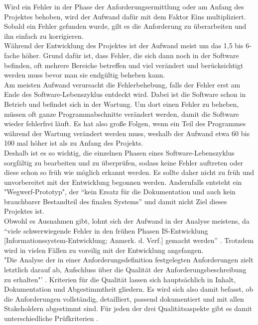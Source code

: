 \documentclass [12pt, a4paper, oneside, titlepage, ngerman]{article}
\begin{document}
\noindent Wird ein Fehler in der Phase der Anforderungsermittlung oder am Anfang des Projektes behoben, wird der Aufwand dafür mit dem Faktor Eins multipliziert. Sobald ein Fehler gefunden wurde, gilt es die Anforderung zu überarbeiten und ihn einfach zu korrigieren.\\
Während der Entwicklung des Projektes ist der Aufwand meist um das 1,5 bis 6-fache höher. Grund dafür ist, dass Fehler, die sich dann noch in der Software befinden, oft mehrere Bereiche betreffen und viel verändert und berücksichtigt werden muss bevor man sie endgültig beheben kann.\\
Am meisten Aufwand verursacht die Fehlerbehebung, falls der Fehler erst am Ende des Software-Lebenszyklus entdeckt wird. Dabei ist die Software schon in Betrieb und befindet sich in der Wartung. Um dort einen Fehler zu beheben, müssen oft ganze Programmabschnitte verändert werden, damit die Software wieder fehlerfrei läuft. Es hat also große Folgen, wenn ein Teil des Programmes während der Wartung verändert werden muss, weshalb der Aufwand etwa 60 bis 100 mal höher ist als zu Anfang des Projekts. \\
Deshalb ist es so wichtig, die einzelnen Phasen eines Software-Lebenszyklus sorgfältig zu bearbeiten und zu überprüfen, sodass keine Fehler auftreten oder diese schon so früh wie möglich erkannt werden. Es sollte daher nicht zu früh und unvorbereitet mit der Entwicklung begonnen werden. Andernfalls entsteht ein "Wegwerf-Prototyp", der "`kein Ersatz für die Dokumentation und auch kein brauchbarer Bestandteil des finalen Systems"' \cite[]{Kuhrmann2012} und damit nicht Ziel dieses Projektes ist.\\
Obwohl es Ausnahmen gibt, lohnt sich der Aufwand in der Analyse meistens, da "`viele schwerwiegende Fehler in den frühen Phasen IS-Entwicklung [Informationssystem-Entwicklung; Anmerk. d. Verf.] gemacht werden"' \cite[S.316]{Alpar2016}. Trotzdem wird in vielen Fällen zu voreilig mit der Entwicklung angefangen. \\
"Die Analyse der in einer Anforderungsdefinition festgelegten Anforderungen zielt letztlich darauf ab, Aufschluss über die Qualität der Anforderungsbeschreibung zu erhalten"' \cite[S.51]{partsch2010}. Kriterien für die Qualität lassen sich hauptsächlich in Inhalt, Dokumentation und Abgestimmtheit gliedern. Es wird sich also damit befasst, ob die Anforderungen vollständig, detailliert, passend dokumentiert und mit allen Stakeholdern abgestimmt sind. Für jeden der drei Qualitätsaspekte gibt es damit unterschiedliche Prüfkriterien \cite[vgl.][S.97]{PohlRupp2015}.
\end{document}
